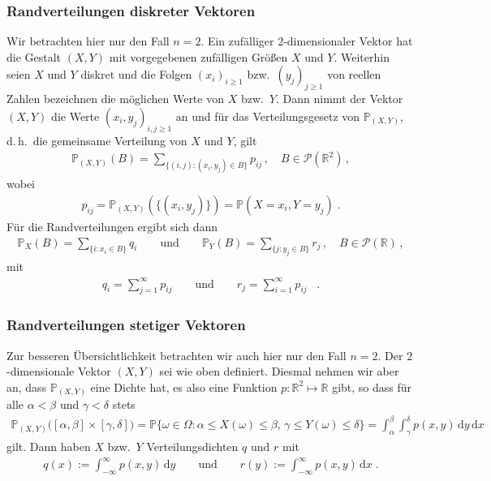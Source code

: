 \documentclass[ngerman,draft,parskip=half,twoside]{scrartcl}
\newcommand*{\R}{\mathbb{R}}      %
\newcommand*{\PotM}{\mathcal{P}}    %
\newcommand*{\WKM}{\mathbb{P}}      %
\begin{document}
\subsubsection{Randverteilungen diskreter Vektoren}
\label{disk}
Wir betrachten hier nur den Fall $n=2$. Ein zufälliger $2$-dimensionaler Vektor hat die Gestalt
$(X,Y)$ mit vorgegebenen zufälligen Größen $X$ und $Y$. Weiterhin seien $X$ und $Y$ diskret und die
Folgen
$(x_i)_{i\ge 1}$ bzw.~$(y_j)_{j\ge 1}$ von reellen Zahlen bezeichnen  die möglichen Werte von $X$ bzw.~$Y$.
Dann nimmt der Vektor $(X,Y)$ die Werte $(x_i,y_j)_{i,j\ge 1}$ an und für das Verteilungsgesetz
von $\WKM_{(X,Y)}$, d.\,h.~die gemeinsame Verteilung von $X$ und $Y$, gilt
\begin{gather*}
  \WKM_{(X,Y)}(B)=\sum_{\{(i,j)\colon (x_i,y_j)\in B\}} p_{ij}\,,\quad B\in\PotM(\R^2)\,,
\end{gather*}
wobei
\begin{gather*}
  p_{ij}= \WKM_{(X,Y)}(\{(x_i,y_j)\})=\WKM(X=x_i,Y=y_j)\;.
\end{gather*}
Für die Randverteilungen ergibt sich dann
\begin{gather*}
  \WKM_X(B)=\sum_{\{i\colon x_i\in B\}} q_i \qquad\mbox{und}\qquad
     \WKM_Y(B)=\sum_{\{j\colon y_j\in B\}} r_j\,,\quad B\in\PotM(\R)\,,
\end{gather*}
mit
\begin{gather*}
  q_i=\sum_{j=1}^\infty p_{ij}\qquad\mbox{und}\qquad r_j=\sum_{i=1}^\infty p_{ij}\;\;\;.
\end{gather*}
\subsubsection{Randverteilungen stetiger Vektoren}
\label{stet}
Zur besseren Übersichtlichkeit betrachten wir auch hier nur den Fall $n=2$. Der
$2$-dimensionale Vektor $(X,Y)$ sei wie oben definiert. Diesmal nehmen wir aber an, dass
$\WKM_{(X,Y)}$ eine Dichte hat, es also eine Funktion $p \colon\R^2\mapsto\R$ gibt, so
dass für alle $\alpha<\beta$ und $\gamma<\delta$ stets
\begin{gather*}
  \WKM_{(X,Y)}\big([\alpha,\beta]\times[\gamma,\delta]\big)
     =\WKM\{\omega\in \Omega \colon \alpha\le X(\omega)\le\beta,\,\gamma\le Y(\omega)\le\delta\}
     =\int_\alpha^\beta\int_\gamma^\delta p(x,y)\,\mathrm d y \,\mathrm d x
\end{gather*}
gilt. Dann haben $X$ bzw.~$Y$ Verteilungsdichten $q$ und $r$ mit
\begin{gather*}
  q(x):=\int_{-\infty}^\infty p(x,y)\,\mathrm d y\qquad\mbox{und}\qquad
     r(y):=\int_{-\infty}^\infty p(x,y)\,\mathrm d x\;.
\end{gather*}
\end{document}
